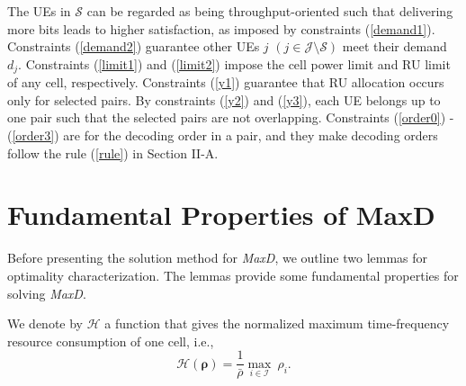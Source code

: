 \documentclass[10pt,journal,final,finalsubmission,twocolumn]{IEEEtran}
\begin{document}
The UEs in $\mathcal{S}$ can be regarded as being throughput-oriented such that delivering more bits leads to higher satisfaction, as imposed by constraints (\ref{demand1}). Constraints (\ref{demand2}) guarantee other UEs $j$ $(j \!\in \!\mathcal{J} \!\setminus\mathcal{S})$ meet their demand $d_j$. Constraints (\ref{limit1}) and (\ref{limit2}) impose the cell power limit and RU limit of any cell, respectively. Constraints (\ref{y1}) guarantee that RU allocation occurs only for selected pairs. By constraints (\ref{y2}) and (\ref{y3}), each UE belongs up to one pair such that the selected pairs are not overlapping. Constraints (\ref{order0}) - (\ref{order3}) are for the decoding order in a pair, and they make decoding orders follow the rule (\ref{rule}) in Section II-A. 



\section{Fundamental Properties of MaxD} \label{Sec:properties}

Before presenting the solution method for {\em MaxD}, we outline two lemmas for optimality characterization. The lemmas provide some fundamental properties for solving {\em MaxD}. 


We denote by $\mathcal{H}$ a function that gives the normalized maximum time-frequency resource consumption of one cell, i.e.,
\begin{equation}
\mathcal{H}(\boldsymbol{\rho}) = \frac{1}{\bar{\rho}}\underset{i\in \mathcal{I}}{\max} \ \rho_i.
\end{equation}
\end{document}
